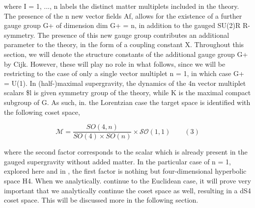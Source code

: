 \documentclass{article}
\begin{document}
where I = 1, ..., n labels the distinct matter multiplets included in the theory. The presence
of the n new vector fields Af, allows for the existence of a further gauge group G+ of dimension
dim G+ = n, in addition to the gauged SU(2)R R-symmetry. The presence of this new gauge
group contributes an additional parameter to the theory, in the form of a coupling constant
X. Throughout this section, we will denote the structure constants of the additional gauge
group G+ by Cijk. However, these will play no role in what follows, since we will be
restricting to the case of only a single vector multiplet n = 1, in which case G+ = U(1).
In (half-)maximal supergravity, the dynamics of the 4n vector multiplet scalars \$l is given
symmetry group of the theory, while K is the maximal compact subgroup of G. As such, in.
the Lorentzian case the target space is identified with the following coset space,


\begin{equation}
\mathcal{M}=\frac{S O(4,n)}{S O(4)\times S O(n)}\times\mathcal{S O}(1,1)\qquad (3)
\end{equation}


where the second factor corresponds to the scalar  which is already present in the gauged
supergravity without added matter. In the particular case of n = 1, explored here and in ,
the first factor is nothing but four-dimensional hyperbolic space H4. When we analytically.
continue to the Euclidean case, it will prove very important that we analytically continue
the coset space as well, resulting in a dS4 coset space. This will be discussed more in the
following section.
\end{document}
